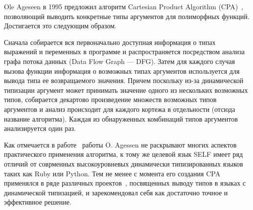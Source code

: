 Ole Ageseen в 1995 предложил алгоритм Cartesian Product Algorithm
(CPA)~\cite{Agesen1995}, позволяющий выводить конкретные типы аргументов для
полиморфных функций. Достигается это следующим образом.

Сначала собирается вся первоначально доступная информация о типах выражений и
переменных в программе и распространяется посредством анализа графа потока
данных (Data Flow Graph --- DFG).  Затем для каждого случая вызова функции
информация о возможных типах аргументов используется для вывода типа ее
возвращаемого значения. Причем поскольку из-за динамической типизации аргумент
может принимать значение одного из нескольких возможных типов, собирается
декартово произведение множеств возможных типов аргументов и анализ происходит
для каждого кортежа в отдельности (отсюда название алгоритма). Каждая из
обнаруженных комбинаций типов аргументов анализируется один раз.

Как отмечается в работе~\cite{Madsen2007} работы O. Agessen не раскрывают
многих аспектов практического применения алгоритма, к тому же целевой язык SELF
имеет ряд отличий от соврменных высокоуровневых динамически типизированных
языков таких как Ruby или Python. Тем не менее с момента его создания CPA
применялся в ряде различных проектов~\cite{Madsen2007,Salib2004,Hanov},
посвященных выводу типов в языках с динамической типизацией, и зарекомендовал
себя как достаточно точное и эффективное решение.






